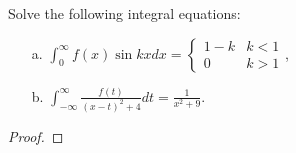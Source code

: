 \begin{problem}{3}
  Solve the following integral equations:
  \begin{enumerate}
    \item[a.] $\displaystyle \int_0^\infty f(x) \sin kx dx = \begin{cases} 1-k & k<1 \\ 0 & k > 1\end{cases}$,
    \item[b.] $\displaystyle \int_{-\infty}^\infty \frac{f(t)}{(x-t)^2 + 4}dt = \frac{1}{x^2+9}$.
  \end{enumerate}
\end{problem}

\begin{proof}
\end{proof}
\newpage
